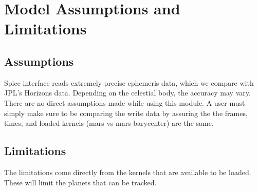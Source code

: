 \section{Model Assumptions and Limitations}

\subsection{Assumptions}

Spice interface reads extremely precise ephemeris data, which we compare with JPL's Horizons data. Depending on the celestial body, the accuracy may vary. 
There are no direct assumptions made while using this module. A user must simply make sure to be comparing the write data by assuring the the frames, times, and loaded kernels (mars vs mars barycenter) are the same.

\subsection{Limitations}

The limitations come directly from the kernels that are available to be loaded. These will limit the planets that can be tracked.